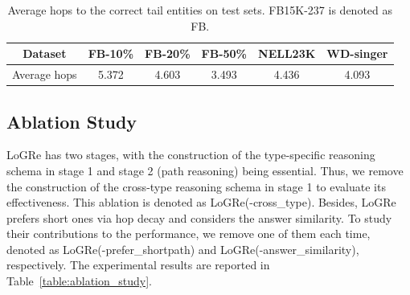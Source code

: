 \documentclass[sigconf]{acmart}
\begin{document}
\begin{table}[htb]
	\setlength{\tabcolsep}{0.45em}
	\centering
	\small
	\caption{Average hops to the correct tail entities on test sets. FB15K-237 is denoted as FB.}
	\begin{tabular}{c|c|c|c|c|c}
		\toprule[1pt]
		Dataset &FB-10\% &FB-20\% &FB-50\% &NELL23K &WD-singer\\
		\midrule[0.5pt]
		Average hops &5.372 &4.603 &3.493 &4.436 &4.093\\
		\bottomrule[1pt]
	\end{tabular}
	\label{table:ave_hops}
\end{table}

\subsection{Ablation Study}
LoGRe has two stages, with the construction of the type-specific reasoning schema in stage 1 and stage 2 (path reasoning) being essential. Thus, we remove the construction of the cross-type reasoning schema in stage 1 to evaluate its effectiveness. This ablation is denoted as LoGRe(-cross\_type). Besides, LoGRe prefers short ones via hop decay and considers the answer similarity. To study their contributions to the performance, we remove one of them each time, denoted as LoGRe(-prefer\_shortpath) and LoGRe(-answer\_similarity), respectively. The experimental results are reported in Table~\ref{table:ablation_study}.
\end{document}
